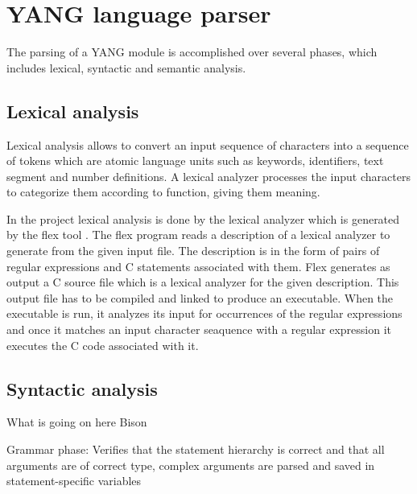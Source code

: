 \documentclass[conference]{IEEEtran}
\begin{document}
\section{YANG language parser}
The parsing of a YANG module is accomplished over several phases, which includes lexical, syntactic and semantic analysis.
\subsection{Lexical analysis}
Lexical analysis allows to convert an input sequence of characters into a sequence of tokens which are atomic language units such as keywords, identifiers, text segment and number definitions. A lexical analyzer processes the input characters to categorize them according to function, giving them meaning.

In the project lexical analysis is done by the lexical analyzer which is generated by the flex tool \cite{bib5}. The flex program reads a description of a lexical analyzer to generate from the given input file. The description is in the form of pairs of regular expressions and C statements associated with them. Flex generates as output a C source file which is a lexical analyzer for the given description. This output file has to be compiled and linked to produce an executable. When the executable is run, it analyzes its input for occurrences of the regular expressions and once it matches an input character seaquence with a regular expression it executes the C code associated with it.

\subsection{Syntactic analysis}
What is going on here
Bison

Grammar phase:
Verifies that the statement hierarchy is correct and that all arguments are of correct type, complex arguments are parsed and saved in statement-specific variables
 
\end{document}
